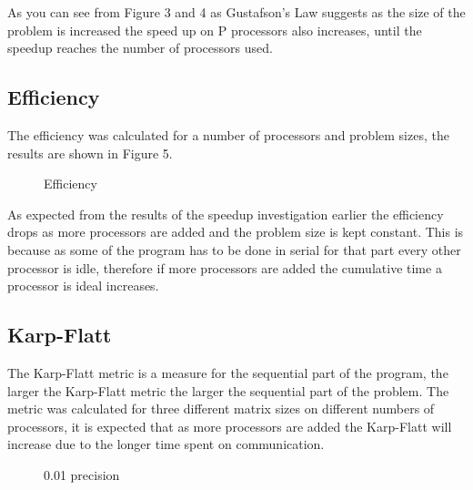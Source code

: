 \documentclass{article}
\begin{document}
  As you can see from Figure 3 and 4 as Gustafson's Law suggests as the size of
  the problem is increased the speed up on P processors also increases, until the
  speedup reaches the number of processors used.

  \subsection{Efficiency}

The efficiency was calculated for a number of processors and problem sizes, the results
are shown in Figure 5.

\begin{figure}[H]
 \centering
 \caption{Efficiency}
 \label{fig:slowdown}
 \end{figure}

As expected from the results of the speedup investigation earlier the efficiency drops
as more processors are added and the problem size is kept constant. This is because
as some of the program has to be done in serial for that part every other processor
is idle, therefore if more processors are added the cumulative time a processor is ideal increases.

\subsection{Karp-Flatt}

The Karp-Flatt metric is a measure for the sequential part of the program, the larger
the Karp-Flatt metric the larger the sequential part of the problem. The metric was
calculated for three different matrix sizes on different numbers of processors, it
is expected that as more processors are added the Karp-Flatt will increase due to
the longer time spent on communication.

\begin{figure}[H]
 \centering
 \caption{0.01 precision}
 \label{fig:karpflatt}
\end{figure}
\end{document}
